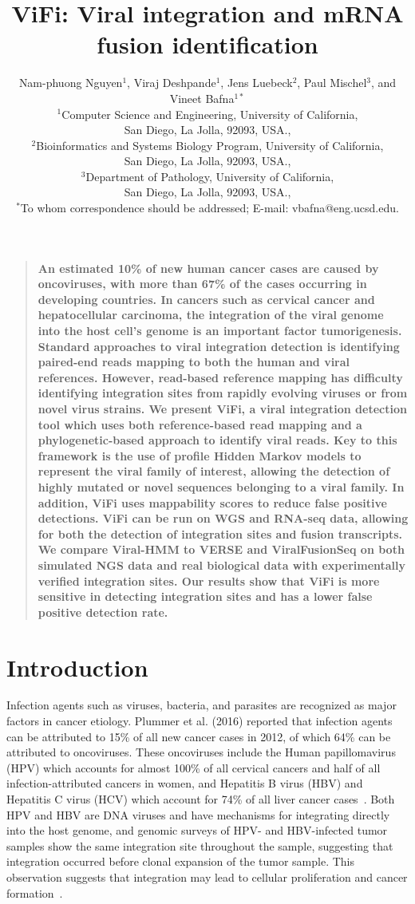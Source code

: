 \documentclass[10pt]{article}
\title{ViFi: Viral integration and mRNA fusion identification}
\author
{Nam-phuong Nguyen$^{1}$, Viraj Deshpande$^{1}$, 
Jens Luebeck$^{2}$, Paul Mischel$^{3}$, and Vineet Bafna$^{1\ast}$\\
\normalsize{$^{1}$Computer Science and Engineering, University of California,}\\
\normalsize{San Diego, La Jolla, 92093, USA.,}\\
\normalsize{$^{2}$Bioinformatics and Systems Biology Program, University of California,}\\
\normalsize{San Diego, La Jolla, 92093, USA.,}\\
\normalsize{$^{3}$Department of Pathology, University of California,}\\
\normalsize{San Diego, La Jolla, 92093, USA.,}\\
\normalsize{$^\ast$To whom correspondence should be addressed; E-mail:  vbafna@eng.ucsd.edu.}
}
\date{}
\newenvironment{sciabstract}{%
\begin{quote} \bf}
{\end{quote}}
\begin{document}
 


\baselineskip24pt


\maketitle 


\begin{sciabstract}
An estimated 10\% of new human cancer cases are caused by oncoviruses, with more than 67\% of the cases occurring in developing countries.  In cancers such as cervical cancer and hepatocellular carcinoma, the integration of the viral genome into the host cell's genome is an important factor tumorigenesis.  Standard approaches to viral integration detection is identifying paired-end reads mapping to both the human and viral references.  However, read-based reference mapping has difficulty identifying integration sites from rapidly evolving viruses or from novel virus strains.  We present ViFi, a viral integration detection tool which uses both reference-based read mapping and a phylogenetic-based approach to identify viral reads.  Key to this framework is the use of profile Hidden Markov models to represent the viral family of interest, allowing the detection of highly mutated or novel  sequences belonging to a viral family.  In addition, ViFi uses mappability scores to reduce false positive detections.  ViFi can be run on WGS and RNA-seq data, allowing for both the detection of integration sites and fusion transcripts.  We compare Viral-HMM to VERSE and ViralFusionSeq on both simulated NGS data and real biological data with experimentally verified integration sites.  Our results show that ViFi is more sensitive in detecting integration sites and has a lower false positive detection rate.
\end{sciabstract}

\section*{Introduction}
Infection agents such as viruses, bacteria, and parasites are recognized as major factors in cancer etiology.  Plummer et al. (2016) reported that infection agents can be attributed to 15\% of all new cancer cases in 2012, of which 64\% can be attributed to oncoviruses.  These oncoviruses include the Human papillomavirus (HPV) which accounts for almost 100\% of all cervical cancers and half of all infection-attributed cancers in women, and Hepatitis B virus (HBV) and Hepatitis C virus (HCV) which account for 74\% of all liver cancer cases~\cite{Plummer2016}.  Both HPV and HBV are DNA viruses and have mechanisms for integrating directly into the host genome, and genomic surveys of HPV- and HBV-infected tumor samples show the same integration site throughout the sample, suggesting that integration occurred before clonal expansion of the tumor sample.  This observation suggests that integration may lead to cellular proliferation and cancer formation~\cite{Moore2010}.
\end{document}

